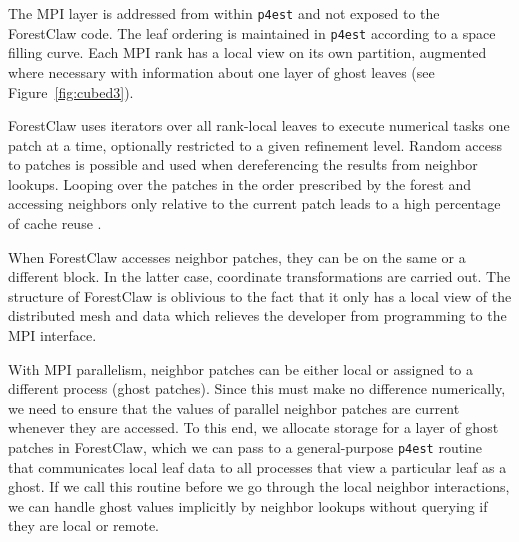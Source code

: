\documentclass{IOS-Book-Article}     %
\newcommand{\comment}[1]{\textcolor{green}{[DAC: #1]}\xspace}
\newcommand{\cO}{\mathcal{O}}
\newcommand{\forestclaw}{ForestClaw\xspace}
\newcommand{\pforest}{\texttt{p4est}\xspace}
\newcommand{\ignore}[1]{}
\newcommand{\Fig}[1]{Figure~\ref{fig:#1}}
\newcommand{\alert}[1]{{\color{red}#1}}
\begin{document}
The MPI layer is addressed from within \pforest and not exposed to the
\forestclaw code.  The \ignore{order of leaves} leaf ordering
is maintained in \pforest according to a
space filling curve.  Each MPI rank has a local view on its own partition,
augmented where necessary with information about one layer of ghost leaves
(see \Fig{cubed3}).

\forestclaw uses iterators over all rank-local leaves to execute numerical
tasks one patch at a time, optionally restricted to a given refinement level.
Random access to patches is possible and used when dereferencing the results
from
neighbor lookups.  Looping over the patches in the order
prescribed by the forest
and
accessing neighbors only relative to the current patch leads to a high
percentage of cache reuse
\cite{BursteddeBurtscherGhattasEtAl09}.

When \forestclaw accesses neighbor patches, they can be on the same or a
different block.  In the latter case, coordinate transformations are carried
out.  The structure of \forestclaw is oblivious to the fact that it only has a
local view of the distributed mesh and data which relieves the developer from
programming to the MPI interface.

With MPI parallelism, neighbor patches can be either local or assigned to a
different process (ghost patches).  Since this must make no difference
numerically, we need to ensure that the values of parallel neighbor patches are current
whenever they are accessed.  To this end, we allocate storage for a layer of
ghost patches in \forestclaw, which we can pass to a general-purpose \pforest
routine that communicates local leaf data to all processes that view a
particular leaf as a ghost.  If we call this routine before we go through the
local neighbor interactions, we can handle ghost values implicitly by neighbor
lookups without querying if they are local or remote.

\end{document}
